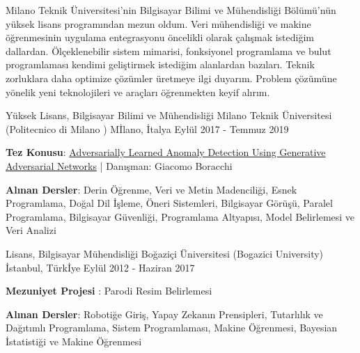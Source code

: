 \documentclass[12pt, a4paper]{awesome-cv_turkish}
\begin{document}
\begin{cvparagraph}
Milano Teknik Üniversitesi'nin Bilgisayar Bilimi ve Mühendisliği Bölümü'nün yüksek lisans
programından mezun oldum. Veri mühendisliği ve makine öğrenmesinin uygulama
entegrasyonu öncelikli olarak çalışmak istediğim dallardan. Ölçeklenebilir sistem mimarisi, 
fonksiyonel programlama ve bulut programlaması kendimi geliştirmek istediğim alanlardan bazıları. 
Teknik zorluklara daha optimize çözümler üretmeye ilgi duyarım. Problem çözümüne yönelik yeni
teknolojileri ve araçları öğrenmekten keyif alırım.
\end{cvparagraph}
\begin{cventries}
  \cventry
    {Yüksek Lisans, Bilgisayar Bilimi ve Mühendisliği} %
    {Milano Teknik Üniversitesi (Politecnico di Milano )} %
    {Mİlano, İtalya} %
    {Eylül 2017 - Temmuz 2019} %
    {
      \begin{cvitems} %
        \item{\textbf{Tez Konusu}: \href{https://github.com/yigitozgumus/Polimi_Thesis/blob/master/Documentation/Thesis/2019_7_Ozgumus_Semsi_Yigit.pdf}{Adversarially Learned Anomaly Detection Using Generative Adversarial Networks} | Danışman: Giacomo Boracchi}
        \item {\textbf{Alınan Dersler}: Derin Öğrenme, Veri ve Metin Madenciliği, Esnek Programlama, Doğal Dil İşleme, Öneri Sistemleri, Bilgisayar Görüşü, Paralel Programlama, Bilgisayar Güvenliği, Programlama Altyapısı, Model Belirlemesi ve Veri Analizi}
      \end{cvitems}
    }
\cventry
{Lisans, Bilgisayar Mühendisliği } %
{Boğaziçi Üniversitesi (Bogazici University)} %
{İstanbul, Türkİye} %
{Eylül 2012 - Haziran 2017} %
{
  \begin{cvitems} %
    \item{\textbf{Mezuniyet Projesi} : Parodi Resim Belirlemesi}
    \item {\textbf{Alınan Dersler}:	Robotiğe Giriş, Yapay Zekanın Prensipleri,
    Tutarlılık ve Dağıtımlı Programlama, Sistem Programlaması, Makine Öğrenmesi, Bayesian İstatistiği ve Makine Öğrenmesi}
  \end{cvitems}
}
\end{cventries}
\end{document}
